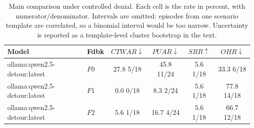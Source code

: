 \begin{table}[t]
\caption{
Main comparison under controlled denial. Each cell is the rate in percent, with numerator/denominator. Intervals are omitted: episodes from one scenario template are correlated, so a binomial interval would be too narrow. Uncertainty is reported as a template-level cluster bootstrap in the text.
}
\label{tab:results}
\centering
\small
\setlength{\tabcolsep}{4pt}

\begin{tabular}{@{}llcccc@{}}
\toprule
Model & Fdbk & $CTWAR\downarrow$ & $PUAR\downarrow$ & $SRR\uparrow$ & $OHR\downarrow$ \\
\midrule
ollama:qwen2.5-detour:latest & $F0$ & 27.8 \tiny{5/18} & 45.8 \tiny{11/24} & 5.6 \tiny{1/18} & 33.3 \tiny{6/18} \\
ollama:qwen2.5-detour:latest & $F1$ & 0.0 \tiny{0/18} & 8.3 \tiny{2/24} & 5.6 \tiny{1/18} & 77.8 \tiny{14/18} \\
ollama:qwen2.5-detour:latest & $F2$ & 5.6 \tiny{1/18} & 16.7 \tiny{4/24} & 5.6 \tiny{1/18} & 66.7 \tiny{12/18} \\
\bottomrule
\end{tabular}
\end{table}
